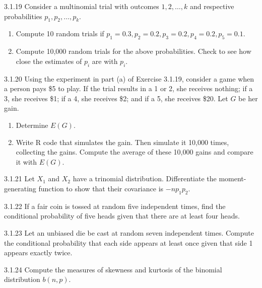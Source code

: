 \begin{exercise}{3.1.19}
Consider a multinomial trial with outcomes $1, 2, \ldots, k$ and respective probabilities $p_1, p_2, \ldots, p_k$.
\begin{enumerate}
\item Compute 10 random trials if $p_1 = 0.3, p_2 = 0.2, p_3 = 0.2, p_4 = 0.2, p_5 = 0.1$.
\item Compute 10,000 random trials for the above probabilities. Check to see how close the estimates of $p_i$ are with $p_i$.
\end{enumerate}
\end{exercise}

\begin{exercise}{3.1.20}
Using the experiment in part (a) of Exercise 3.1.19, consider a game when a person pays \$5 to play. If the trial results in a 1 or 2, she receives nothing; if a 3, she receives \$1; if a 4, she receives \$2; and if a 5, she receives \$20. Let $G$ be her gain.
\begin{enumerate}
\item Determine $E(G)$.
\item Write R code that simulates the gain. Then simulate it 10,000 times, collecting the gains. Compute the average of these 10,000 gains and compare it with $E(G)$.
\end{enumerate}
\end{exercise}

\begin{exercise}{3.1.21}
Let $X_1$ and $X_2$ have a trinomial distribution. Differentiate the moment-generating function to show that their covariance is $-np_1 p_2$.
\end{exercise}

\begin{exercise}{3.1.22}
If a fair coin is tossed at random five independent times, find the conditional probability of five heads given that there are at least four heads.
\end{exercise}

\begin{exercise}{3.1.23}
Let an unbiased die be cast at random seven independent times. Compute the conditional probability that each side appears at least once given that side 1 appears exactly twice.
\end{exercise}

\begin{exercise}{3.1.24}
Compute the measures of skewness and kurtosis of the binomial distribution $b(n,p)$.
\end{exercise}

